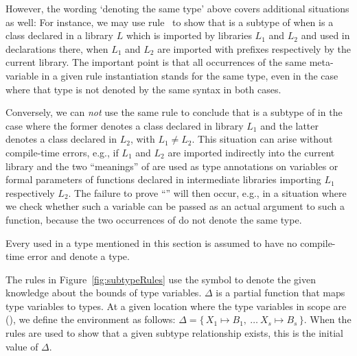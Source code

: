 \documentclass[makeidx]{article}
\begin{document}
{{However, the wording `denoting the same type' above covers
additional situations as well:
For instance, we may use rule~\SrnReflexivity{}
to show that  is a subtype of
 when  is a class declared in a
library $L$ which is imported by libraries $L_1$ and $L_2$ and
used in declarations there,
when $L_1$ and $L_2$ are imported with prefixes
 respectively  by the current library.
The important point is that all occurrences of the same meta-variable
in a given rule instantiation stands for the same type,
even in the case where that type is not denoted by
the same syntax in both cases.

Conversely, we can \emph{not} use the same rule to conclude
that  is a subtype of 
in the case where the former denotes a class declared in library $L_1$
and the latter denotes a class declared in $L_2$, with $L_1 \not= L_2$.
This situation can arise without compile-time errors, e.g.,
if $L_1$ and $L_2$ are imported indirectly into the current library
and the two ``meanings'' of  are used
as type annotations on variables or formal parameters of functions
declared in intermediate libraries importing $L_1$ respectively $L_2$.
The failure to prove
``''
will then occur, e.g., in a situation where we check whether
such a variable can be passed as an actual argument to such a function,
because the two occurrences of  do not denote the same type.%
}

\LMHash{}%
Every  used in a type mentioned in this section is assumed to
have no compile-time error and denote a type.


\LMHash{}%
The rules in Figure~\ref{fig:subtypeRules} use
the symbol \Index{$\Delta$} to denote the given knowledge about the
bounds of type variables.
$\Delta$ is a partial function that maps type variables to types.
At a given location where the type variables in scope are
\TypeParametersStd{}
(),
we define the environment as follows:
$\Delta = \{\,X_1 \mapsto B_1,\ \ldots\ X_s \mapsto B_s\,\}$.
When the rules are used to show that a given subtype relationship exists,
this is the initial value of $\Delta$.

}
\end{document}
